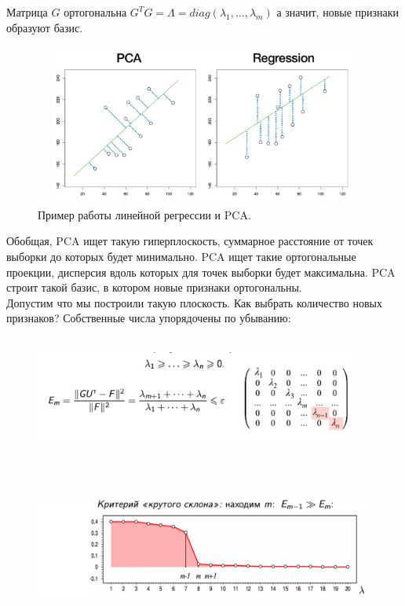 \documentclass[12pt,a4paper]{article}
\begin{document}
Матрица $G$ ортогональна $G^TG = \Lambda = diag(\lambda_1, \ldots, \lambda_m)$ а значит, новые признаки образуют базис.

\begin{figure}[h]
\includegraphics[scale=0.75, width = 480, height = 200]{regression.png}
\caption{Пример работы линейной регрессии и PCA.}
\label{ris:image}
\end{figure}

Обобщая, PCA ищет такую гиперплоскость, суммарное расстояние от точек выборки до которых будет минимально.
PCA ищет такие ортогональные проекции, дисперсия вдоль которых для точек выборки будет максимальна.
PCA строит такой базис, в котором новые признаки ортогональны.\\

Допустим что мы построили такую плоскость. Как выбрать количество новых признаков?
Собственные числа упорядочены по убыванию:

\begin{figure}[h]
\includegraphics[scale=0.75, width = 400, height = 150]{sz.png}
\label{ris:image}
\end{figure}

\begin{figure}[h]
\includegraphics[scale=0.75, width = 480, height = 200]{krutoi_sklon.png}
\label{ris:image}
\end{figure}
\end{document}
